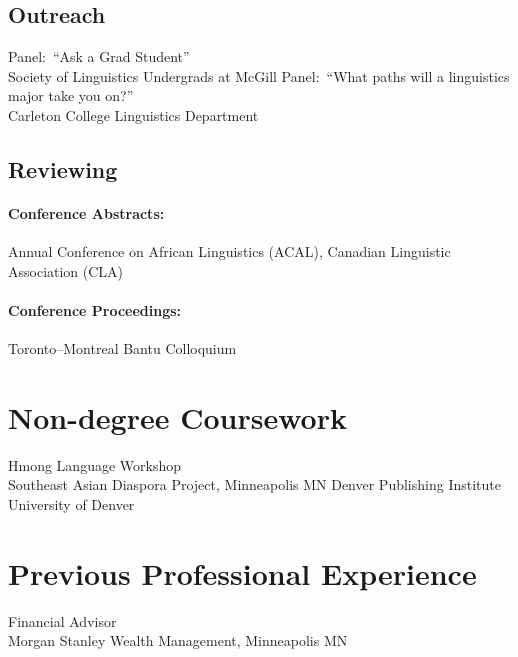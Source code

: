 \documentclass[11pt,oneside,letterpaper]{johnstoncv}
\begin{document}
\begin{entries}
\subsection{Outreach}
\Item[2022, 2023] Panel:\ ``Ask a Grad Student''\\Society of Linguistics Undergrads at McGill
\Item[2015] Panel:\ ``What paths will a linguistics major take you on?''\\Carleton College Linguistics Department

\subsection{Reviewing}
\paragraph{Conference Abstracts:} Annual Conference on African Linguistics (ACAL), Canadian Linguistic Association (CLA)
\paragraph{Conference Proceedings:} Toronto--Montreal Bantu Colloquium

\section{Non-degree Coursework}
\Item[2020] Hmong Language Workshop\\Southeast Asian Diaspora Project, Minneapolis MN
\Item[2013] Denver Publishing Institute\\University of Denver

\section{Previous Professional Experience}
\Item[2014--2018] Financial Advisor\\Morgan Stanley Wealth Management, Minneapolis MN


\end{entries}


\end{document}
